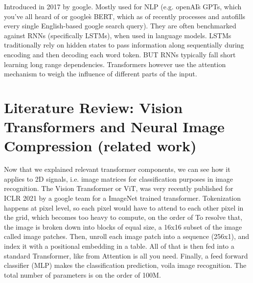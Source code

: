 \documentclass[pdftex,11pt,titlepage,twoside,openright]{report}
\begin{document}
Introduced in 2017 by google. Mostly used for NLP (e.g. openAI\`s GPTs, which you've all 
heard of or google\`s BERT, which as of recently processes and autofills every single 
English-based google search query). They are often benchmarked against RNNs (specifically LSTMs), 
when used in language models. LSTMs traditionally rely on hidden states to pass information along 
sequentially during encoding and then decoding each word token. BUT RNNs typically fall short 
learning long range dependencies.
Transformers however use the attention mechanism to weigh the influence of different parts of the input.



\newpage




%
%
\cleardoublepage
\chapter{Literature Review: Vision Transformers and Neural Image Compression (related work)}

Now that we explained relevant transformer components, we can see how it applies to 2D signals, i.e. image matrices for classification purposes in image recognition.
The Vision Transformer or ViT, was very recently published for ICLR 2021 by a google team for a ImageNet trained transformer.
Tokenization happens at pixel level, so each pixel would have to attend to  each other pixel in the grid, which becomes too heavy to compute, on the order of
To resolve that, the image is broken down into blocks of equal size, a 16x16 subset of the image called image patches. Then, unroll each image patch into a sequence (256x1), and index it with a positional embedding in a table. All of that is then fed into a standard Transformer, like from Attention is all you need. Finally, a feed forward classifier (MLP) makes the classification prediction, voila image recognition.
The total number of parameters is on the order of 100M.

\newpage


%
%
\cleardoublepage
\end{document}
